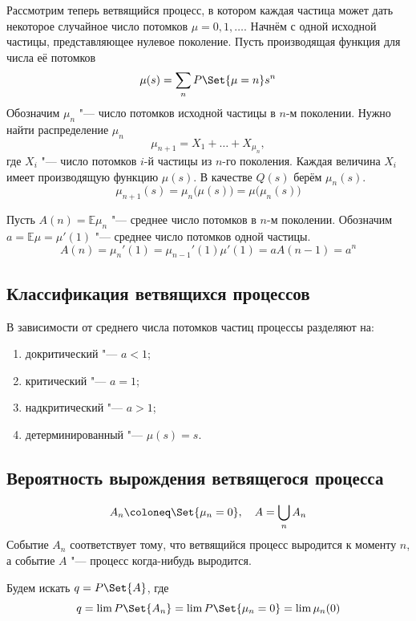 Рассмотрим теперь ветвящийся процесс, в котором каждая частица может дать некоторое случайное число
потомков $ \mu = 0, 1, \dots $.
Начнём с одной исходной частицы, представляющее нулевое поколение.
Пусть производящая функция для числа её потомков
$$ \mu(s) = \sum_n P\Set{\mu = n}s^n $$
Обозначим $ \mu_n $ "--- число потомков исходной частицы в $ n $-м поколении.
Нужно найти распределение $ \mu_n $
$$ \mu_{n + 1} = X_1 + \dots + X_{\mu_n}, $$
где $ X_i $ "--- число потомков $ i $-й частицы из $ n $-го поколения.
Каждая величина $ X_i $ имеет производящую функцию $ \mu(s) $.
В качестве $ Q(s) $ берём $ \mu_n(s) $.
$$ \mu_{n + 1}(s) = \mu_n \bigl( \mu(s) \bigr) = \mu \bigl( \mu_n(s) \bigr) $$

Пусть $ A(n) = \mathbb E \mu_n $ "--- среднее число потомков в $ n $-м поколении.
Обозначим $ a = \mathbb E\mu = \mu'(1) $ "--- среднее число потомков одной частицы.
$$ A(n) = \mu_n'(1) = \mu_{n - 1}'(1) \mu'(1) = aA(n - 1) = a^n $$

\subsection{Классификация ветвящихся процессов}

В зависимости от среднего числа потомков частиц процессы разделяют на:
\begin{enumerate}
    \item докритический "--- $ a < 1 $;
    \item критический "--- $ a = 1 $;
    \item надкритический "--- $ a > 1 $;
    \item детерминированный "--- $ \mu(s) = s $.
\end{enumerate}

\subsection{Вероятность вырождения ветвящегося процесса}

$$ A_n \coloneq \Set{\mu_n = 0}, \quad A = \bigcup_n A_n $$
Событие $ A_n $ соответствует тому, что ветвящийся процесс выродится к моменту $ n $, а событие
$ A $ "--- процесс когда-нибудь выродится.

Будем искать $ q = P\Set{A} $, где
$$ q = \lim P\Set{A_n} = \lim P\Set{\mu_n = 0} = \lim \mu_n(0) $$


